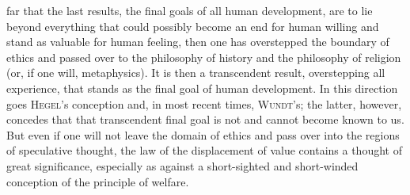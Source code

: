 \documentclass[12pt,a4paper,openany]{book}
\begin{document}
far that the last results, the final goals of all human development, are to lie beyond everything that could possibly
become an end for human willing and stand as valuable for human feeling, then one has overstepped the boundary of
ethics and passed over to the philosophy of history and the philosophy of religion (or, if one will, metaphysics). It is
then a transcendent result, overstepping all experience, that stands as the final goal of human development. In this
direction goes \textsc{Hegel}'s conception and, in most recent times, \textsc{Wundt}'s; the latter, however, concedes that
that transcendent final goal is not and cannot become known to us. But even if one will not leave the domain of ethics
and pass over into the regions of speculative thought, the law of the displacement of value contains a thought of great
significance, especially as against a short-sighted and short-winded conception of the principle of welfare.
\end{document}
